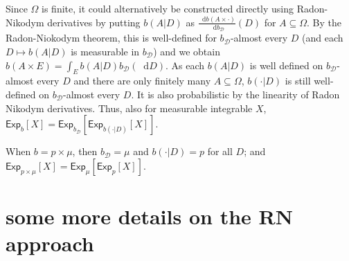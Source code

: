 \documentclass[a4paper]{article}
\newcommand\Exp{\mathsf{Exp}}
\newcommand\U{\mathfrak{U}} %
\newcommand{\Decs}{\mathcal{D}}
\newcommand\s{\mathsf{s}}
\newcommand{\n}{\mathsf{n}}
\renewcommand{\nu}{\n}
\renewcommand{\color}[1]{}
\newenvironment{colored}[1]{\leavevmode\color{#1}}{}
\newcommand*\diff{\mathop{}\!\mathrm{d}}
\newenvironment{CCM rewritten}
{\begingroup\color{blue}} %
{\endgroup}              %
\begin{document}
\begin{colored}{violet}
Since $\Omega$ is finite, it could alternatively be constructed directly using Radon-Nikodym derivatives by putting $b(A|D)$ as $\frac{\diff b(A\times\cdot)}{\diff b_\Decs}(D)$ for $A\subseteq\Omega$. 
By the Radon-Niokodym theorem, this is well-defined for $b_\Decs$-almost every $D$ (and each $D\mapsto b(A|D)$ is measurable in $b_\Decs$) and we obtain $b(A\times E)=\int_E b(A|D) b_\Decs(\diff D)$.
As each $b(A|D)$ is well defined on $b_\Decs$-almost every $D$ and there are only finitely many $A\subseteq\Omega$, $b(\cdot|D)$ is still well-defined on $b_\Decs$-almost every $D$. It is also probabilistic by the linearity of Radon Nikodym derivatives. Thus, also for measurable integrable $X$, $\Exp_b[X]=\Exp_{b_\Decs}[\Exp_{b(\cdot|D)}[X]]$.





%
%
%
%
%
%
%
%
%
%
%


When $b=p\times\mu$, then $b_\Decs=\mu$ and $b(\cdot|D)=p$ for all $D$; and $\Exp_{p\times\mu}[X]=\Exp_{\mu}[\Exp_{p}[X]]$.





\begin{colored}{red}
	\section{some more details on the RN approach}
	

\end{colored}
\end{colored}
\end{document}
